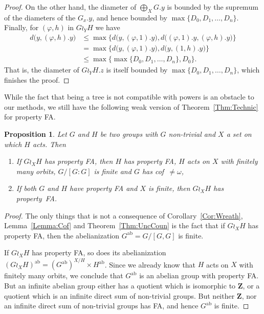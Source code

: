 \documentclass[a4paper]{article}
\newtheorem{prop}[lem]{Proposition}
\theoremstyle{definition}
\DeclareMathOperator\ab{ab}
\newcommand*{\field}[1]{\mathbf{#1}}
\newcommand*{\Z}{\field{Z}}
\begin{document}
\begin{proof}
On the other hand, the diameter of $\bigoplus_XG.y$ is bounded by the supremum of the diameters of the $G_x.y$, and hence bounded by $\max\{D_0,D_1,\dots,D_n\}$.
Finally, for $(\varphi,h)$ in $G\wr_YH$ we have
\begin{align*}
	d\bigl(y,(\varphi,h).y\bigr)&\leq\max\{d\bigl(y,(\varphi,1).y\bigr),d\bigl((\varphi,1).y,(\varphi,h).y\bigr)\}\\
	&=\max\{d\bigl(y,(\varphi,1).y\bigr),d\bigl(y,(1,h).y\bigr)\}\\
	&\leq\max\{\max\{D_0,D_1,\dots,D_n\},D_0\}.
\end{align*}
That is, the diameter of $G\wr_YH.z$ is itself bounded by $\max\{D_0,D_1,\dots,D_n\}$, which finishes the proof.
\end{proof}
%
%
While the fact that being a tree is not compatible with powers is an obstacle to our methods, we still have the following weak version of Theorem~\ref{Thm:Technic} for property FA.
%
%
\begin{prop}\label{Prop:WRFA}
Let $G$ and $H$ be two groups with $G$ non-trivial and $X$ a set on which $H$ acts.
Then
\begin{enumerate}
\item If $G\wr_XH$ has property FA, then $H$ has property FA, $H$ acts on $X$ with finitely many orbits, $G/[G:G]$ is finite and $G$ has cof~$\neq\omega$,
\item If both $G$ and $H$ have property FA and $X$ is finite, then $G\wr_XH$ has property~FA.
\end{enumerate}
\end{prop}
\begin{proof}
The only things that is not a consequence of Corollary~\ref{Cor:Wreath}, Lemma~\ref{Lemma:Cof} and Theorem~\ref{Thm:UncCoun} is the fact that if $G\wr_XH$ has property FA, then the abelianization $G^{\ab}=G/[G,G]$ is finite.

If $G\wr_XH$ has property FA, so does its abelianization $(G\wr_XH)^{\ab}=(G^{\ab})^{X/H}\times H^{\ab}$. Since we already know that $H$ acts on $X$ with finitely many orbits, we conclude that $G^{\ab}$ is an abelian group with property FA.
But an infinite abelian group either has a quotient which is isomorphic to $\Z$, or a quotient which is an infinite direct sum of non-trivial groups.
But neither $\Z$, nor an infinite direct sum of non-trivial groups has FA, and hence $G^{\ab}$ is finite.
\end{proof}
\end{document}
